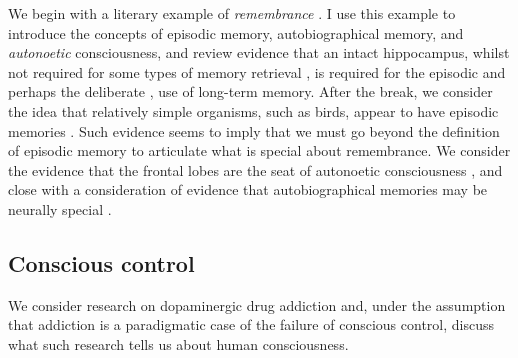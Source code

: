 \documentclass[11pt]{article}
\begin{document}
We begin with a literary example of \emph{remembrance}
\cite{proust}. I use this example to introduce the concepts of
episodic memory, autobiographical memory, and \emph{autonoetic}
consciousness, and review evidence that an intact hippocampus, whilst
not required for some types of memory retrieval \cite{cermak85}, is
required for the episodic \cite{rempel96} and perhaps the deliberate
\cite{badd94}, use of long-term memory. After the break, we consider
the idea that relatively simple organisms, such as birds, appear to
have episodic memories \cite{clay98}. Such evidence seems to imply
that we must go beyond the definition of episodic memory to articulate
what is special about remembrance. We consider the evidence that the
frontal lobes are the seat of autonoetic consciousness
\cite{wheeler97}, and close with a consideration of evidence that
autobiographical memories may be neurally special \cite{fink99}.

\subsection{Conscious control}

We consider research on dopaminergic drug addiction \cite{robinson03}
and, under the assumption that addiction is a paradigmatic case of the
failure of conscious control, discuss what such research tells us
about human consciousness.


 {}
\end{document}
